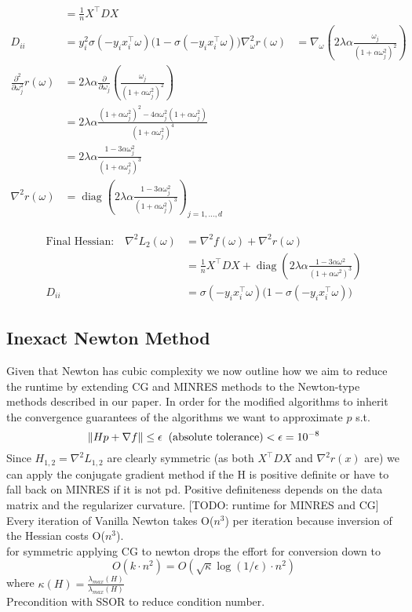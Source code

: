 \documentclass{article}
\begin{document}
\begin{align*}
&= \frac{1}{n} X^\top D X \\
D_{ii} &= y_i^2 \sigma(-y_i x_i^\top \omega)\big(1 - \sigma(-y_i x_i^\top \omega)\big)
%
%
%
\nabla ^2 _\omega r(\omega) &= \nabla _\omega \left(2 \lambda \alpha \frac{\omega_j}{(1 + \alpha \omega_j^2)^2} \right)\\
\frac{\partial^2}{\partial \omega_j^2} r(\omega) &= 2 \lambda \alpha \frac{\partial}{\partial \omega_j} \left( \frac{\omega_j}{(1 + \alpha \omega_j^2)^2} \right) \\
&= 2 \lambda \alpha \frac{(1 + \alpha \omega_j^2)^2 - 4 \alpha \omega_j^2 (1 + \alpha \omega_j^2)}{(1 + \alpha \omega_j^2)^4} \\
&= 2 \lambda \alpha \frac{1 - 3 \alpha \omega_j^2}{(1 + \alpha \omega_j^2)^3} \\
\nabla^2 r(\omega) &= \operatorname{diag}\left(2 \lambda \alpha \frac{1 - 3 \alpha \omega_j^2}{(1 + \alpha \omega_j^2)^3}\right)_{j=1,\ldots,d}
\end{align*}

\begin{align}
\text{Final Hessian:} \quad \nabla^2 L_2(\omega) &= \nabla^2 f(\omega) + \nabla^2 r(\omega) \\
&= \frac{1}{n} X^\top D X + \operatorname{diag}\left(2 \lambda \alpha \frac{1 - 3 \alpha \omega^2}{(1 + \alpha \omega^2)^3}\right) \\
D_{ii} &= \sigma(-y_i x_i^\top \omega) \big(1 - \sigma(-y_i x_i^\top \omega)\big)
\end{align}



\subsection{Inexact Newton Method}
Given that Newton has cubic complexity we now outline how we aim to reduce the runtime by extending CG and MINRES methods to the Newton-type methods described in our paper. In order for the modified algorithms to inherit the convergence guarantees of the algorithms we want to approximate $p$ s.t.
$$ \| H p + \nabla f \| \leq \epsilon \hspace{0.2cm} \text{(absolute tolerance)} < \epsilon = 10^{-8} $$
Since $H_{1,2} = \nabla ^2 L_{1,2}$ are clearly symmetric (as both $X^\top D X$ and $\nabla ^2 r(x)$ are) we can apply the conjugate gradient method 
if the H is positive definite or have to fall back on MINRES if it is not pd. Positive definiteness depends on the data matrix and the regularizer curvature.
[TODO: runtime for MINRES and CG]\\
Every iteration of Vanilla Newton takes O($n^3$) per iteration because inversion of the Hessian costs O($n^3$).\\
for symmetric applying CG to newton drops the effort for conversion down to 
$$O(k\cdot n^2) = O(\sqrt{\kappa}\log \left( 1/\epsilon\right) \cdot n^2)$$ where $\kappa(H) = \frac{\lambda_{max}(H)}{\lambda_{max}(H)}$\\
Precondition with SSOR to reduce condition number.


\end{document}
